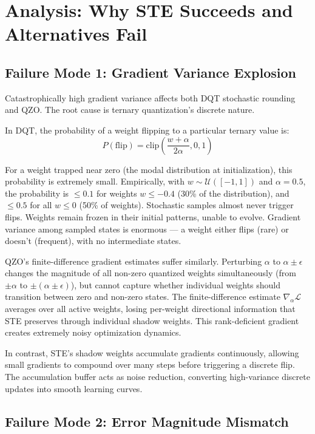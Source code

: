 \documentclass{article}
\begin{document}
\section{Analysis: Why STE Succeeds and Alternatives Fail}

\subsection{Failure Mode 1: Gradient Variance Explosion}

Catastrophically high gradient variance affects both DQT stochastic rounding and QZO. The root cause is ternary quantization's discrete nature.

In DQT, the probability of a weight flipping to a particular ternary value is:
\begin{equation}
P(\text{flip}) = \text{clip}\left(\frac{w + \alpha}{2\alpha}, 0, 1\right)
\end{equation}

For a weight trapped near zero (the modal distribution at initialization), this probability is extremely small. Empirically, with $w \sim \mathcal{U}([-1, 1])$ and $\alpha = 0.5$, the probability is $\leq 0.1$ for weights $w \leq -0.4$ (30\% of the distribution), and $\leq 0.5$ for all $w \leq 0$ (50\% of weights). Stochastic samples almost never trigger flips. Weights remain frozen in their initial patterns, unable to evolve. Gradient variance among sampled states is enormous --- a weight either flips (rare) or doesn't (frequent), with no intermediate states.

QZO's finite-difference gradient estimates suffer similarly. Perturbing $\alpha$ to $\alpha \pm \epsilon$ changes the magnitude of all non-zero quantized weights simultaneously (from $\pm\alpha$ to $\pm(\alpha \pm \epsilon)$), but cannot capture whether individual weights should transition between zero and non-zero states. The finite-difference estimate $\nabla_\alpha \mathcal{L}$ averages over all active weights, losing per-weight directional information that STE preserves through individual shadow weights. This rank-deficient gradient creates extremely noisy optimization dynamics.

In contrast, STE's shadow weights accumulate gradients continuously, allowing small gradients to compound over many steps before triggering a discrete flip. The accumulation buffer acts as noise reduction, converting high-variance discrete updates into smooth learning curves.

\subsection{Failure Mode 2: Error Magnitude Mismatch}
\end{document}
